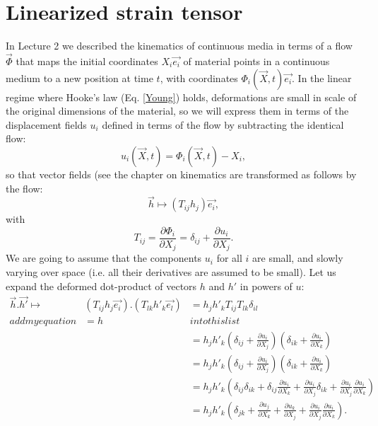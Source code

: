 \documentclass[DIV=12]{article}
\begin{document}
\section{Linearized strain tensor}
In Lecture 2 we described the kinematics of continuous media in terms of a flow $\vec{\Phi}$ that maps the initial coordinates $X_i\vec{e_i}$
of material points in a continuous medium to a new position at time $t$, with coordinates $\Phi_i( \vec{X}, t ) \vec{e_i}$.  
In the linear regime where Hooke's law (Eq. \ref{Young}) holds, deformations are small in scale of the original dimensions of the material,
 so  we will express them in terms of the displacement fields $u_i$ defined in terms of the flow
 by subtracting the identical flow:
\begin{equation}
u_i( \vec{X},t) = \Phi_i( \vec{X},t) - X_i,
\end{equation}  
so that vector fields (see the chapter on kinematics are transformed as follows 
 by the flow:
\begin{equation}
\vec{h} \mapsto \left(  T_{ij}h_j\right) \vec{e_i},
\end{equation}
with 
\begin{equation}
  T_{ij} = \frac{\partial \Phi_i}{\partial X_j} = \delta_{ij} + \frac{\partial u_i}{\partial X_j}.
\end{equation}
 We are going to assume that the components $u_i$ for all $i$ are small, and slowly varying over space (i.e. all their derivatives
 are assumed to be small).
Let us expand the deformed dot-product of vectors $h$ and $h'$ in powers of $u$:
\[
\boxed{
\begin{array}{lll}\vec{h}.\vec{h'} \mapsto& \left( T_{ij} h_j \vec{e_i} \right) .\left( T_{lk}h'_k \vec{e_l}\right) &  = h_j h'_k T_{ij} T_{lk}  \delta_{il}\\
   add my equation & = h & into this list\\
    &  &   = h_j h'_k   \left(  \delta_{ij} + \frac{\partial u_i}{\partial X_j} \right)  \left( \delta_{ik} + \frac{\partial u_i}{\partial X_k}  \right) \\
    &  & =h_j h'_k   \left(  \delta_{ij} + \frac{\partial u_i}{\partial X_j} \right)  \left( \delta_{ik} + \frac{\partial u_i}{\partial X_k}  \right)\\
    &  & = h_j h'_k   \left(  \delta_{ij} \delta_{ik} +  \delta_{ij}\frac{\partial u_i}{\partial X_k} +\frac{\partial u_i}{\partial X_j} \delta_{ik}+
 \frac{\partial u_i}{\partial X_j} \frac{\partial u_i}{\partial X_k} \right)\\
    &  & = h_j h'_k   \left(  \delta_{jk} +  \frac{\partial u_j}{\partial X_k} + \frac{\partial u_k}{\partial X_j}  + \frac{\partial u_i}{\partial X_j} \frac{\partial u_i}{\partial X_k} \right).
  \end{array}}
\label{dotTransform}
\]
\end{document}
